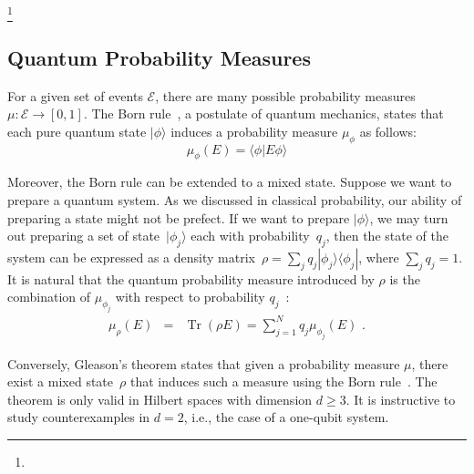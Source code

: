 \documentclass{article}
\theoremstyle{remark}
\newcommand{\events}{\ensuremath{\mathcal{E}}}
\newcommand{\ket}[1]{|#1\rangle}
\newcommand{\ip}[2]{\langle #1 | #2 \rangle}
\newcommand{\proj}[1]{|#1 \rangle\langle #1 |}
\newcommand{\yutsung}[1]{\fbox{\begin{minipage}{0.9\textwidth}\color{purple}{Yu-Tsung says: #1}\end{minipage}}}
\newcommand{\Tr}{\mathop{\mathrm{Tr}}\nolimits}
\begin{document}
\footnote{\yutsung{The definition of independence is interesting, and we
definitely need to discuss it when we want to discuss Bell's theorem and the Kochen-Specker
theorem. However, the definition diverges. So we just leave it so far, and we
will go back if we really need it in this paper. (Maybe when discussing repeating
experiments?)}}

\subsection{Quantum Probability Measures}

For a given set of events $\events$, there are many possible probability
measures $\mu:\events\rightarrow[0,1]$. The Born rule~\cite{Born1984,Mermin2007,RiederSvozil2007},
a postulate of quantum mechanics, states that each pure quantum state
$\ket{\phi}$ induces a probability measure $\mu_{\phi}$ as follows:
\[
\mu_{\phi}(E)=\ip{\phi}{E\phi}
\]

Moreover, the Born rule can be extended to a mixed state. Suppose
we want to prepare a quantum system. As we discussed in classical
probability, our ability of preparing a state might not be prefect.
If we want to prepare $\ket{\phi}$, we may turn out preparing a set
of state~$\ket{\phi_{j}}$ each with probability~$q_{j}$, then
the state of the system can be expressed as a density matrix~$\rho=\sum_{j}q_{j}\proj{\phi_{j}}$,
where $\sum_{j}q_{j}=1$. It is natural that the quantum probability
measure introduced by $\rho$ is the combination of $\mu_{\phi_{j}}$
with respect to probability $q_{j}$~\cite{peres1995quantum,544199,RiederSvozil2007}:
\begin{eqnarray}
\mu_{\rho}\left(E\right) & = & \Tr\left(\rho E\right)=\sum_{j=1}^{N}q_{j}\mu_{\phi_{j}}\left(E\right)\textrm{ .}\label{BornRule.mixed}
\end{eqnarray}

Conversely, Gleason's theorem states that given a probability measure
$\mu$, there exist a mixed state~$\rho$ that induces such a measure
using the Born rule~\cite{gleason1957,Redhead1987-REDINA,peres1995quantum}.
The theorem is only valid in Hilbert spaces with dimension $d\geq3$.
It is instructive to study counterexamples in $d=2$, i.e., the case
of a one-qubit system.
\end{document}

